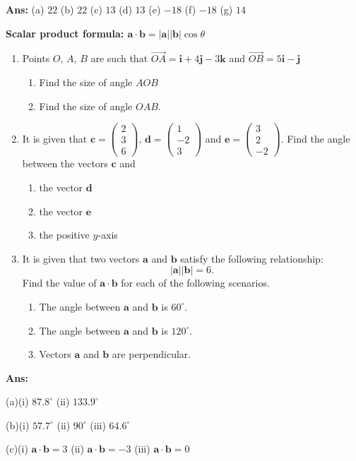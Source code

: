 \documentclass[a4paper,11pt,oneside]{book}
\providecommand{\vv}[1]{\overrightarrow{#1}}\providecommand{\cvv}[3]{\begin{pmatrix}#1\\#2\\#3\end{pmatrix}}
\newcounter{wq}[section]
\newcommand{\Q}[1]{\par\needspace{5\baselineskip}\medskip\stepcounter{wq}\noindent\textbf{\thewq}\quad #1\par}
\begin{document}
\par\smallskip \textbf{Ans:} \quad (a) $22$ \quad (b) $22$ \quad (c) $13$ \quad (d) $13$ \quad (e) $-18$ \quad (f) $-18$ \quad (g) $14$
\Q{\textbf{Scalar product formula: $\mathbf a\cdot\mathbf b=|\mathbf a||\mathbf b|\cos\theta$}\par\smallskip \begin{enumerate}[label=(\alph*)]
\item Points $O$, $A$, $B$ are such that $\vv{OA}=\mathbf i+4\mathbf j-3\mathbf k$ and $\vv{OB}=5\mathbf i-\mathbf j$
\begin{enumerate}[label=(\roman*)]
\item Find the size of angle $AOB$
\item Find the size of angle $OAB$.
\end{enumerate}
\item It is given that $\mathbf c=\cvv{2}{3}{6}$, $\mathbf d=\cvv{1}{-2}{3}$ and $\mathbf e=\cvv{3}{2}{-2}$. Find the angle between the vectors $\mathbf c$ and
\begin{enumerate}[label=(\roman*)]
\item the vector $\mathbf d$
\item the vector $\mathbf e$
\item the positive $y$-axis
\end{enumerate}
\item It is given that two vectors $\mathbf a$ and $\mathbf b$ satisfy the following relationship:
\[
|\mathbf a||\mathbf b|=6.
\]
Find the value of $\mathbf a\cdot\mathbf b$ for each of the following scenarios.
\begin{enumerate}[label=(\roman*)]
\item The angle between $\mathbf a$ and $\mathbf b$ is $60^\circ$.
\item The angle between $\mathbf a$ and $\mathbf b$ is $120^\circ$.
\item Vectors $\mathbf a$ and $\mathbf b$ are perpendicular.
\end{enumerate}
\end{enumerate}}
\par\smallskip \textbf{Ans:}\par (a)(i) $87.8^\circ$ \quad (ii) $133.9^\circ$\par (b)(i) $57.7^\circ$ \quad (ii) $90^\circ$ \quad (iii) $64.6^\circ$\par (c)(i) $\mathbf a\cdot\mathbf b=3$ \quad (ii) $\mathbf a\cdot\mathbf b=-3$ \quad (iii) $\mathbf a\cdot\mathbf b=0$
\end{document}
